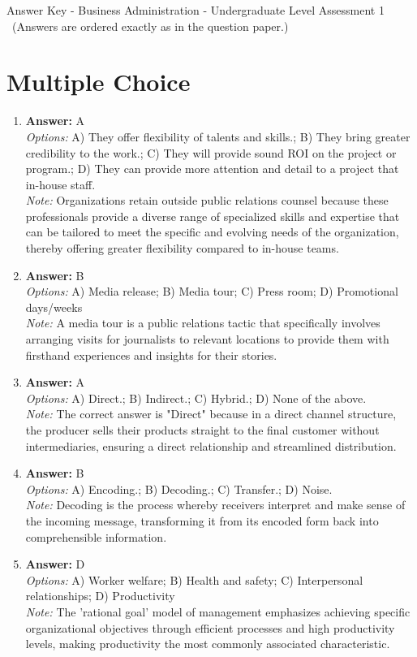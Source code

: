 \documentclass[12pt]{article}
\begin{document}
\begin{center}
Answer Key - Business Administration - Undergraduate Level Assessment 1 \
\small (Answers are ordered exactly as in the question paper.)
\end{center}

\section*{Multiple Choice}
\begin{enumerate}[label=\arabic*.]
\item \textbf{Answer:} A
\\ \textit{Options:} A) They offer flexibility of talents and skills.; B) They bring greater credibility to the work.; C) They will provide sound ROI on the project or program.; D) They can provide more attention and detail to a project that in-house staff.
\\ \textit{Note:} Organizations retain outside public relations counsel because these professionals provide a diverse range of specialized skills and expertise that can be tailored to meet the specific and evolving needs of the organization, thereby offering greater flexibility compared to in-house teams.
\item \textbf{Answer:} B
\\ \textit{Options:} A) Media release; B) Media tour; C) Press room; D) Promotional days/weeks
\\ \textit{Note:} A media tour is a public relations tactic that specifically involves arranging visits for journalists to relevant locations to provide them with firsthand experiences and insights for their stories.
\item \textbf{Answer:} A
\\ \textit{Options:} A) Direct.; B) Indirect.; C) Hybrid.; D) None of the above.
\\ \textit{Note:} The correct answer is "Direct" because in a direct channel structure, the producer sells their products straight to the final customer without intermediaries, ensuring a direct relationship and streamlined distribution.
\item \textbf{Answer:} B
\\ \textit{Options:} A) Encoding.; B) Decoding.; C) Transfer.; D) Noise.
\\ \textit{Note:} Decoding is the process whereby receivers interpret and make sense of the incoming message, transforming it from its encoded form back into comprehensible information.
\item \textbf{Answer:} D
\\ \textit{Options:} A) Worker welfare; B) Health and safety; C) Interpersonal relationships; D) Productivity
\\ \textit{Note:} The 'rational goal' model of management emphasizes achieving specific organizational objectives through efficient processes and high productivity levels, making productivity the most commonly associated characteristic.
\end{enumerate}
\end{document}
